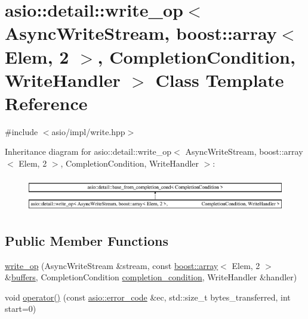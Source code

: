 \hypertarget{classasio_1_1detail_1_1write__op_3_01_async_write_stream_00_01boost_1_1array_3_01_elem_00_012_018cbe26fbc46920cd28943bf9ace97230}{}\section{asio\+:\+:detail\+:\+:write\+\_\+op$<$ Async\+Write\+Stream, boost\+:\+:array$<$ Elem, 2 $>$, Completion\+Condition, Write\+Handler $>$ Class Template Reference}
\label{classasio_1_1detail_1_1write__op_3_01_async_write_stream_00_01boost_1_1array_3_01_elem_00_012_018cbe26fbc46920cd28943bf9ace97230}


{\ttfamily \#include $<$asio/impl/write.\+hpp$>$}

Inheritance diagram for asio\+:\+:detail\+:\+:write\+\_\+op$<$ Async\+Write\+Stream, boost\+:\+:array$<$ Elem, 2 $>$, Completion\+Condition, Write\+Handler $>$\+:\begin{figure}[H]
\begin{center}
\leavevmode
\includegraphics[height=1.511471cm]{classasio_1_1detail_1_1write__op_3_01_async_write_stream_00_01boost_1_1array_3_01_elem_00_012_018cbe26fbc46920cd28943bf9ace97230}
\end{center}
\end{figure}
\subsection*{Public Member Functions}
\begin{DoxyCompactItemize}
\item 
\hyperlink{classasio_1_1detail_1_1write__op_3_01_async_write_stream_00_01boost_1_1array_3_01_elem_00_012_018cbe26fbc46920cd28943bf9ace97230_a74e3ea27274739e5378777abab0ba9b0}{write\+\_\+op} (Async\+Write\+Stream \&stream, const \hyperlink{classboost_1_1array}{boost\+::array}$<$ Elem, 2 $>$ \&\hyperlink{group__async__read_ga54dede45c3175148a77fe6635222c47d}{buffers}, Completion\+Condition \hyperlink{group__async__read_gae2e215d5013596cc2b385bb6c13fa518}{completion\+\_\+condition}, Write\+Handler \&handler)
\item 
void \hyperlink{classasio_1_1detail_1_1write__op_3_01_async_write_stream_00_01boost_1_1array_3_01_elem_00_012_018cbe26fbc46920cd28943bf9ace97230_aacd57d8a69d7d0496d0bbd7fab2fd41e}{operator()} (const \hyperlink{classasio_1_1error__code}{asio\+::error\+\_\+code} \&ec, std\+::size\+\_\+t bytes\+\_\+transferred, int start=0)
\end{DoxyCompactItemize}
